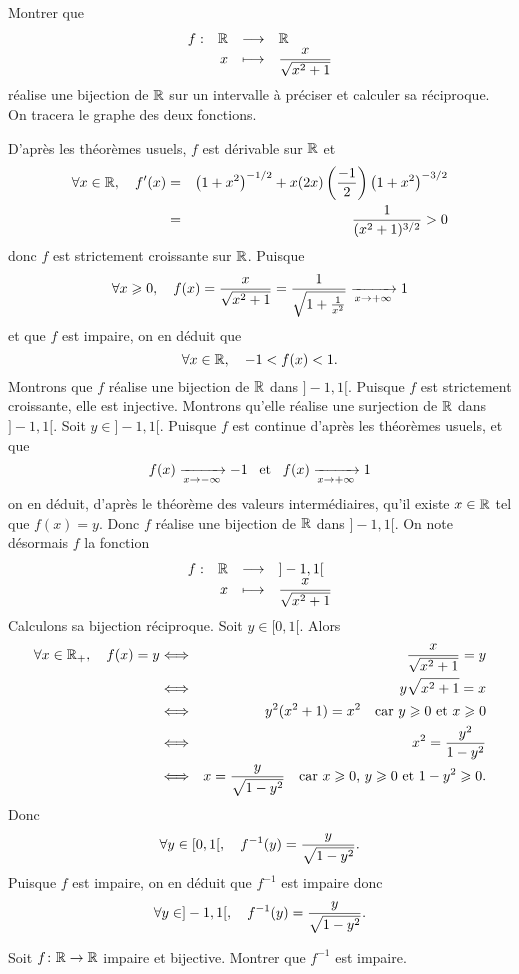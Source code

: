 \documentclass{magnolia}
\begin{document}



Montrer que \[\begin{array}[t]{lrcl} \displaystyle{f} : & \displaystyle{\mathbb{R}} & \longrightarrow & \displaystyle{\mathbb{R}} \\ & \displaystyle{x} & \longmapsto & \displaystyle{\frac{x}{\sqrt{x^2+1}}} \end{array}\] réalise une bijection de $\mathbb{R}$ sur un intervalle à préciser et calculer sa réciproque. On tracera le graphe des deux fonctions.
\begin{sol}
D'après les théorèmes usuels, $f$ est dérivable sur $\mathbb{R}$ et
\begin{eqnarray*}
\forall x \in \mathbb{R},\quad f'(x)
&=&\left(1+x^2\right)^{-1/2}+x(2x)\left(\frac{-1}{2}\right)\left(1+x^2\right)^{-3/2}\\
&=&\frac{1}{(x^2+1)^{3/2}}>0
\end{eqnarray*}
donc $f$ est strictement croissante sur $\mathbb{R}$. Puisque
\[\forall x\geqslant 0,\quad f(x)=\frac{x}{\sqrt{x^2+1}}=\frac{1}{\sqrt{1+\frac{1}{x^2}}}\xrightarrow[x\rightarrow +\infty]{} 1\]
et que $f$ est impaire, on en déduit que
\[\forall x\in\mathbb{R},\quad -1<f(x)<1.\]
Montrons que $f$ réalise une bijection de $\mathbb{R}$ dans $]-1,1[$. Puisque $f$ est strictement croissante, elle est injective. Montrons qu'elle réalise une surjection de $\mathbb{R}$ dans $]-1,1[$. Soit $y\in]-1,1[$. Puisque $f$ est continue d'après les théorèmes usuels, et que 
\[f(x)\xrightarrow[x\rightarrow -\infty]{}-1 \quad\!\text{et}\quad\! f(x)\xrightarrow[x\rightarrow +\infty]{}1\]
on en déduit, d'après le théorème des valeurs intermédiaires, qu'il existe $x\in\mathbb{R}$ tel que $f(x)=y$. Donc $f$ réalise une bijection de $\mathbb{R}$ dans $]-1,1[$. On note désormais $f$ la fonction
\[\begin{array}[t]{lrcl} \displaystyle{f} : & \displaystyle{\mathbb{R}} & \longrightarrow & \displaystyle{]-1,1[} \\ & \displaystyle{x} & \longmapsto & \displaystyle{\frac{x}{\sqrt{x^2+1}}} \end{array}\]
Calculons sa bijection réciproque. Soit $y\in[0,1[$. Alors
\begin{eqnarray*}
\forall x\in\mathbb{R}_+,\quad f(x)=y
&\Longleftrightarrow& \frac{x}{\sqrt{x^2+1}}=y\\
&\Longleftrightarrow& y\sqrt{x^2+1}=x\\
&\Longleftrightarrow& y^2(x^2+1)=x^2 \quad\text{car $y\geqslant 0$ et $x\geqslant 0$}\\
&\Longleftrightarrow& x^2=\frac{y^2}{1-y^2}\\
&\Longleftrightarrow& x=\frac{y}{\sqrt{1-y^2}} \quad\text{car $x\geqslant 0$, $y\geqslant 0$ et $1-y^2\geqslant 0$.}
\end{eqnarray*}
Donc
\[\forall y\in[0,1[,\quad f^{-1}(y)=\frac{y}{\sqrt{1-y^2}}.\]
Puisque $f$ est impaire, on en déduit que $f^{-1}$ est impaire donc
\[\forall y\in]-1,1[,\quad f^{-1}(y)=\frac{y}{\sqrt{1-y^2}}.\]
\end{sol}


Soit $f\colon \mathbb{R} \rightarrow \mathbb{R}$ impaire et bijective. Montrer que $f^{-1}$ est impaire.
\end{document}
